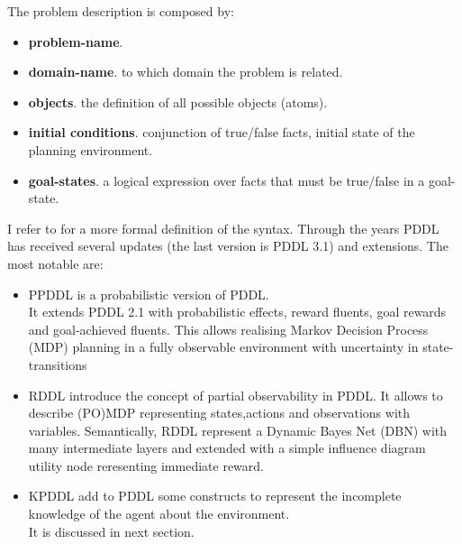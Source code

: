 \documentclass[pdftex,12pt,a4paper]{report}
\begin{document}
The problem description is composed by:
\begin{itemize}
\item \textbf{problem-name}.
\item \textbf{domain-name}. to which domain the problem is related.
\item \textbf{objects}. the definition of all possible objects (atoms).
\item \textbf{initial conditions}. conjunction of true/false facts, initial state of the planning environment.
\item \textbf{goal-states}. a logical expression over facts that must be true/false in a goal-state.
\end{itemize}
\noindent I refer to \cite{mcdermott1998pddl}%
for a more formal definition of the syntax.
\noindent Through the years PDDL has received several updates (the last version is PDDL 3.1) and extensions.
The most notable are:
\begin{itemize}
\item PPDDL\cite{younes2004ppddl1}%
is a probabilistic version of PDDL. 
\\\noindent It extends PDDL 2.1 with probabilistic effects, reward fluents, goal rewards and goal-achieved fluents. This allows realising Markov Decision Process (MDP) planning in a fully observable environment with uncertainty in state-transitions
\item RDDL\cite{sanner2010relational}%
introduce the concept of partial observability in PDDL. It allows to describe (PO)MDP representing states,actions and observations with variables. Semantically, RDDL represent a Dynamic Bayes Net (DBN) with many intermediate layers and extended with a simple influence diagram utility node reresenting immediate reward.
\item KPDDL\cite{iocchi2003}%
add to PDDL some constructs to represent the incomplete knowledge of the agent about the environment. 
\\\noindent It is discussed in next section.
\end{itemize}
\end{document}
